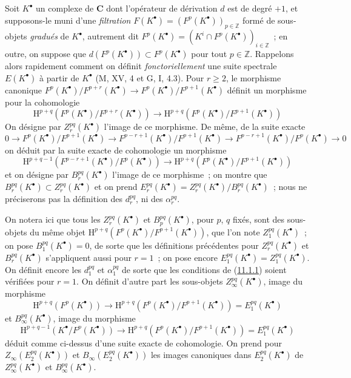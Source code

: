 \begin{env}[11.2.2]
\label{0.11.2.2-fr}
Soit $K^\bullet$ un complexe de $\boldsymbol{C}$ dont l'opérateur de dérivation
$d$ est de degré $+1$, et supposons-le muni d'une \emph{filtration}
$F(K^\bullet)=(F^p(K^\bullet))_{p\in\mathbb Z}$ formé de sous-
objets \emph{gradués} de $K^\bullet$, autrement dit
$F^p(K^\bullet)=(K^i\cap F^p(K^\bullet))_{i\in\mathbb Z}$~; en outre, on
suppose que $d(F^p(K^\bullet))\subset F^p(K^\bullet)$ pour tout
$p\in\mathbb Z$. Rappelons alors rapidement comment on définit
\emph{fonctoriellement} une suite spectrale $E(K^\bullet)$ à partir de
$K^\bullet$ (M, XV, 4 et G, I, 4.3). Pour $r\geq2$, le morphisme canonique
$F^p(K^\bullet)/F^{p+r}(K^\bullet)\to
F^p(K^\bullet)/F^{p+1}(K^\bullet)$ définit un morphisme pour la cohomologie
\[
  \mathrm H^{p+q}(F^p(K^\bullet)/F^{p+r}(K^\bullet))
  \longrightarrow
  \mathrm H^{p+q}(F^p(K^\bullet)/F^{p+1}(K^\bullet))
\]
On désigne par $Z_r^{pq}(K^\bullet)$ l'image de ce morphisme. De même, de la
suite exacte
\[
  0\to F^p(K^\bullet)/F^{p+1}(K^\bullet)
  \to F^{p-r+1}(K^\bullet)/F^{p+1}(K^\bullet)
  \to F^{p-r+1}(K^\bullet)/F^p(K^\bullet)\to0
\]
on déduit par la suite exacte de cohomologie un morphisme
\[
  \mathrm H^{p+q-1}(F^{p-r+1}(K^\bullet)/F^p(K^\bullet))
  \longrightarrow
  \mathrm H^{p+q}(F^p(K^\bullet)/F^{p+1}(K^\bullet))
\]
et on désigne par $B_r^{pq}(K^\bullet)$ l'image de ce morphisme~; on montre
que $B_r^{pq}(K^\bullet)\subset Z_r^{pq}(K^\bullet)$ et on prend
$E_r^{pq}(K^\bullet)=Z_r^{pq}(K^\bullet)/B_r^{pq}(K^\bullet)$~; nous ne
préciserons pas la définition des $d_r^{pq}$, ni des $\alpha_r^{pq}$.

On notera ici que tous les $Z_r^{pq}(K^\bullet)$ et
$B_p^{pq}(K^\bullet)$, pour $p$, $q$ fixés, sont des sous-objets du même
objet
$\mathrm H^{p+q}(F^p(K^\bullet)/F^{p+1}(K^\bullet))$, que l'on note
$Z_1^{pq}(K^\bullet)$~; on pose $B_1^{pq}(K^\bullet)=0$, de sorte que les
définitions précédentes pour $Z_r^{pq}(K^\bullet)$ et
$B_r^{pq}(K^\bullet)$ s'appliquent aussi pour $r=1$~; on pose encore
$E_1^{pq}(K^\bullet)=Z_1^{pq}(K^\bullet)$. On définit encore les $d_1^{pq}$
et $\alpha_1^{pq}$ de sorte que les conditions de
(\hyperref[0.11.1.1-fr]{11.1.1}) soient vérifiées pour $r=1$. On définit
d'autre part les sous-objets $Z_\infty^{pq}(K^\bullet)$, image du morphisme
\[
  \mathrm H^{p+q}(F^p(K^\bullet))\longrightarrow
  \mathrm H^{p+q}(F^p(K^\bullet)/F^{p+1}(K^\bullet))
  =E_1^{pq}(K^\bullet)
\]
et $B_\infty^{pq}(K^\bullet)$, image du morphisme
\[
  \mathrm H^{p+q-1}(K^\bullet/F^p(K^\bullet))\longrightarrow
  \mathrm H^{p+q}(F^p(K^\bullet)/F^{p+1}(K^\bullet))
  =E_1^{pq}(K^\bullet)
\]
déduit comme ci-dessus d'une suite exacte de cohomologie. On prend pour
$Z_\infty(E_2^{pq}(K^\bullet))$ et $B_\infty(E_2^{pq}(K^\bullet))$ les
images canoniques dans $E_2^{pq}(K^\bullet)$ de
$Z_\infty^{pq}(K^\bullet)$ et $B_\infty^{pq}(K^\bullet)$.


\end{env}
